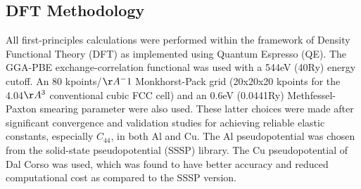\documentclass{article}
\begin{document}
\subsection{DFT Methodology} \label{sct:dft_calcsettings_and_methods}

All first-principles calculations were performed within the framework of Density Functional Theory (DFT) as implemented
using Quantum Espresso\cite{Giannozzi2009} (QE).  The GGA-PBE\cite{Perdew1996} exchange-correlation functional was used with a
544eV (40Ry) energy cutoff.  An 80 kpoints/$\AA^-1$ Monkhorst-Pack grid\cite{Pack1977SpecialIntegrations} 
(20x20x20 kpoints for the 4.04$\AA^3$ conventional cubic FCC cell) and an 0.6eV (0.0441Ry) Methfessel-Paxton smearing parameter \cite{Methfessel1989High-precisionMetals} were also used.  These latter choices were made after significant convergence and validation studies for achieving reliable elastic constants, especially $C_{44}$, in both Al and Cu.  The Al pseudopotential was chosen from the solid-state pseudopotential (SSSP) library\cite{Prandini2018}.  The Cu pseudopotential of Dal Corso\cite{DalCorso2014} was used, which was found to have better 
accuracy and reduced computational cost as compared to the SSSP version.
\end{document}
